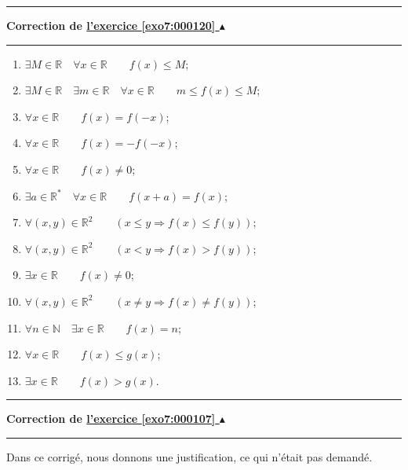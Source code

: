 \documentclass[11pt,a4paper]{article}
\newcommand{\Nn}{\mathbb{N}} \newcommand{\N}{\mathbb{N}}
\newcommand{\Rr}{\mathbb{R}} \newcommand{\R}{\mathbb{R}}
\newcounter{exo}
\newcommand{\correction}[1]{\hypertarget{cor7:#1}{}\label{cor7:#1}{\bf Correction de \hyperlink{exo7:#1}{l'exercice \ref{exo7:#1} $\blacktriangle$}}\vspace{1mm}\hrule\vspace{1mm}}
\newcommand{\fincorrection}{\vspace{1mm}\hrule\vspace*{7mm}}
\begin{document}
\fincorrection
\correction{000120}
\begin{enumerate}
  \item $\exists M \in \Rr \quad \forall x \in \Rr \qquad f(x) \leq M$;
  \item $\exists M \in \Rr\quad \exists m \in \Rr \quad \forall x \in \Rr \qquad m \leq f(x) \leq M$;
  \item $\forall x \in \Rr \qquad f(x) = f(-x)$;
  \item $\forall x \in \Rr \qquad f(x) = -f(-x)$;
  \item $\forall x \in \Rr \qquad f(x) \not= 0$;
  \item $\exists a \in \Rr^* \quad \forall x \in \Rr \qquad f(x+a) = f(x)$;
  \item $\forall (x,y) \in \Rr^2 \qquad (x\leq y \Rightarrow f(x) \leq f(y))$;
  \item $\forall (x,y) \in \Rr^2 \qquad (x < y \Rightarrow f(x) > f(y))$;
  \item $\exists x \in \Rr \qquad  f(x) \not= 0$;
  \item $\forall (x,y) \in \Rr^2 \qquad (x\not= y \Rightarrow f(x) \not= f(y))$;
  \item $\forall n\in \Nn \quad \exists x \in \Rr \qquad f(x)=n$;
  \item $\forall x \in \Rr \qquad f(x) \leq g(x)$;
  \item $\exists x \in \Rr \qquad f(x) > g(x)$.
\end{enumerate}
\fincorrection
\correction{000107}
Dans ce corrig\'e, nous donnons une justification, ce qui n'\'etait
pas demand\'e.
\end{document}

